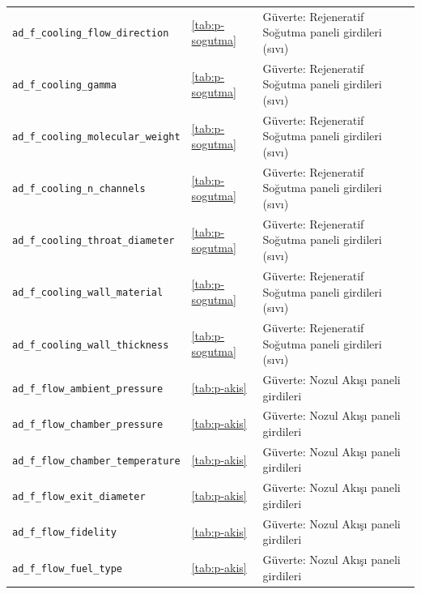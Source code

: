 \documentclass[11pt,a4paper]{article}
\begin{document}
{\begin{longtable}{@{}>{\raggedright\arraybackslash}p{5.2cm}p{1.4cm}>{\raggedright\arraybackslash}p{7.4cm}@{}}
\texttt{ad\_\allowbreak{}f\_\allowbreak{}cooling\_\allowbreak{}flow\_\allowbreak{}direction} & \ref{tab:p-sogutma} & Güverte: Rejeneratif Soğutma paneli girdileri (sıvı) \\
\texttt{ad\_\allowbreak{}f\_\allowbreak{}cooling\_\allowbreak{}gamma} & \ref{tab:p-sogutma} & Güverte: Rejeneratif Soğutma paneli girdileri (sıvı) \\
\texttt{ad\_\allowbreak{}f\_\allowbreak{}cooling\_\allowbreak{}molecular\_\allowbreak{}weight} & \ref{tab:p-sogutma} & Güverte: Rejeneratif Soğutma paneli girdileri (sıvı) \\
\texttt{ad\_\allowbreak{}f\_\allowbreak{}cooling\_\allowbreak{}n\_\allowbreak{}channels} & \ref{tab:p-sogutma} & Güverte: Rejeneratif Soğutma paneli girdileri (sıvı) \\
\texttt{ad\_\allowbreak{}f\_\allowbreak{}cooling\_\allowbreak{}throat\_\allowbreak{}diameter} & \ref{tab:p-sogutma} & Güverte: Rejeneratif Soğutma paneli girdileri (sıvı) \\
\texttt{ad\_\allowbreak{}f\_\allowbreak{}cooling\_\allowbreak{}wall\_\allowbreak{}material} & \ref{tab:p-sogutma} & Güverte: Rejeneratif Soğutma paneli girdileri (sıvı) \\
\texttt{ad\_\allowbreak{}f\_\allowbreak{}cooling\_\allowbreak{}wall\_\allowbreak{}thickness} & \ref{tab:p-sogutma} & Güverte: Rejeneratif Soğutma paneli girdileri (sıvı) \\
\texttt{ad\_\allowbreak{}f\_\allowbreak{}flow\_\allowbreak{}ambient\_\allowbreak{}pressure} & \ref{tab:p-akis} & Güverte: Nozul Akışı paneli girdileri \\
\texttt{ad\_\allowbreak{}f\_\allowbreak{}flow\_\allowbreak{}chamber\_\allowbreak{}pressure} & \ref{tab:p-akis} & Güverte: Nozul Akışı paneli girdileri \\
\texttt{ad\_\allowbreak{}f\_\allowbreak{}flow\_\allowbreak{}chamber\_\allowbreak{}temperature} & \ref{tab:p-akis} & Güverte: Nozul Akışı paneli girdileri \\
\texttt{ad\_\allowbreak{}f\_\allowbreak{}flow\_\allowbreak{}exit\_\allowbreak{}diameter} & \ref{tab:p-akis} & Güverte: Nozul Akışı paneli girdileri \\
\texttt{ad\_\allowbreak{}f\_\allowbreak{}flow\_\allowbreak{}fidelity} & \ref{tab:p-akis} & Güverte: Nozul Akışı paneli girdileri \\
\texttt{ad\_\allowbreak{}f\_\allowbreak{}flow\_\allowbreak{}fuel\_\allowbreak{}type} & \ref{tab:p-akis} & Güverte: Nozul Akışı paneli girdileri \\

\end{longtable}}
\end{document}
